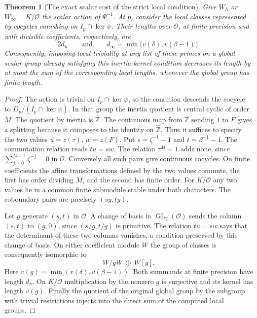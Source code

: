 \documentclass[a4paper,11pt]{article}
\newtheorem{theorem}[proposition]{Theorem}
\theoremstyle{definition}
\theoremstyle{remark}
\newcommand{\ZZ}{\mathbb Z}\newcommand{\ord}{\operatorname{ord}}
\numberwithin{equation}{section}
\begin{document}
\begin{theorem}[The exact scalar cost of the strict local condition]
\leavevmode\label{thm:scalarconductor655}
Give \(W_h\) or \(W_\infty=K/\mathcal O\) the scalar action of
\(\Psi^{-1}\). At \(p\), consider the local classes represented by
cocycles vanishing on \(I_p\cap\ker\psi\). Their lengths over
\(\mathcal O\), at finite precision and with divisible coefficients,
respectively, are
\[
             2d_h\qquad\text{and}\qquad
             d_\infty=\min\bigl(v(\delta),v(\beta-1)\bigr).
\]
Consequently, imposing local triviality at any list of these primes
on a global scalar group already satisfying this inertia-kernel
condition decreases its length by at most the sum of the corresponding
local lengths, whenever the global group has finite length.
\end{theorem}
\begin{proof}
The action is trivial on \(I_p\cap\ker\psi\), so the condition
descends the cocycle to \(D_p/(I_p\cap\ker\psi)\). In that group
the inertia quotient is central cyclic of order \(M\). The quotient
by inertia is \(\widehat{\ZZ}\). The continuous map from
\(\widehat{\ZZ}\) sending \(1\) to \(F\) gives a splitting because
it composes to the identity on \(\widehat{\ZZ}\). Thus it suffices to
specify the two values \(u=z(\tau)\), \(w=z(F)\).
Put \(s=\zeta^{-1}-1\) and \(t=\beta^{-1}-1\). The commutation
relation reads \(tu=sw\). The relation \(\tau^M=1\) adds none,
since \(\sum_{j=0}^{M-1}\zeta^{-j}=0\) in \(\mathcal O\).
Conversely all such pairs give continuous cocycles. On finite
coefficients the affine transformations defined by the two values
commute, the first has order dividing \(M\), and the second has
finite order. For \(K/\mathcal O\) any two values lie in a common
finite submodule stable under both characters. The coboundary
pairs are precisely \((sy,ty)\).

Let \(g\) generate \((s,t)\) in \(\mathcal O\). A change of basis in
\(\operatorname{GL}_2(\mathcal O)\) sends the column \((s,t)\) to
\((g,0)\), since \((s/g,t/g)\) is primitive. The relation \(tu=sw\)
says that the determinant of these two columns vanishes, a condition
preserved by this change of basis. On either coefficient module \(W\)
the group of classes is consequently isomorphic to
\[
                         W/gW\ \oplus\ W[g].
\]
Here \(v(g)=\min(v(\delta),v(\beta-1))\). Both summands at finite
precision have length \(d_h\). On \(K/\mathcal O\) multiplication by
the nonzero \(g\) is surjective and its kernel has length \(v(g)\).
Finally the quotient of the original global group by the subgroup
with trivial restrictions injects into the direct sum of the
computed local groups.
\end{proof}
\end{document}
